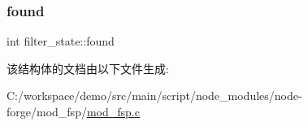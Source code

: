 \subsubsection{\texorpdfstring{found}{found}}
{\footnotesize\ttfamily int filter\+\_\+state\+::found}



该结构体的文档由以下文件生成\+:\begin{DoxyCompactItemize}
\item 
C\+:/workspace/demo/src/main/script/node\+\_\+modules/node-\/forge/mod\+\_\+fsp/\mbox{\hyperlink{mod__fsp_8c}{mod\+\_\+fsp.\+c}}\end{DoxyCompactItemize}

